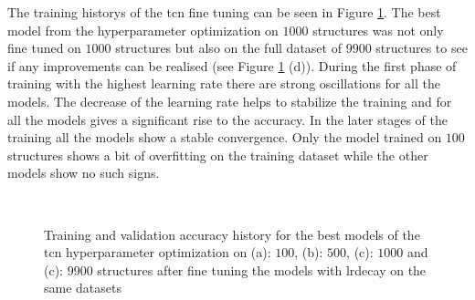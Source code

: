 \documentclass[conference]{IEEEtran}
\begin{document}
 The training historys of the \gls{tcn} fine tuning can be seen in Figure \ref{fig:accuracy_adaptiveLR_TCN}. The best model from the hyperparameter optimization on $ 1000 $ structures was not only fine tuned on $ 1000 $ structures but also on the full dataset of $ 9900 $ structures to see if any improvements can be realised (see Figure \ref{fig:accuracy_adaptiveLR_TCN} (d)). During the first phase of training with the highest learning rate there are strong oscillations for all the models. The decrease of the learning rate helps to stabilize the training and for all the models gives a significant rise to the accuracy. In the later stages of the training all the models show a stable convergence. Only the model trained on $ 100 $ structures shows a bit of overfitting on the training dataset while the other models show no such signs. 

\begin{figure}[htp]
	\centering
	\quad
	\\
	\quad
	\caption{Training and validation accuracy history for the best models of the \gls{tcn} hyperparameter optimization on (a): $ 100 $, (b): $ 500 $, (c): $ 1000 $ and (c): $ 9900 $ structures after fine tuning the models with \gls{lrdecay} on the same datasets}
	\label{fig:accuracy_adaptiveLR_TCN}
\end{figure}
\end{document}
